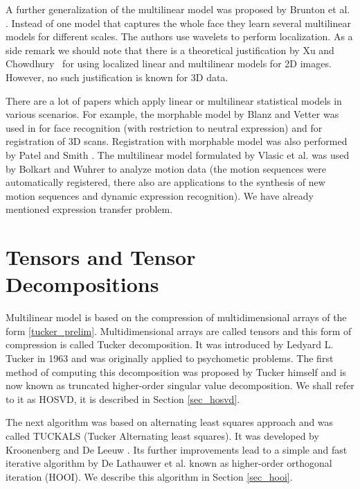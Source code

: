 A further generalization of the multilinear model was proposed by Brunton et al. \cite{brunton_mwave}.
Instead of one model that captures the whole face they learn several multilinear
models for different scales. The authors use wavelets to perform localization.
As a side remark we should note that there is a theoretical justification 
by Xu and Chowdhury~\cite{xu2008} for using localized linear and multilinear models for 2D images.
However, no such justification is known for 3D data.


There are a lot of papers which apply linear or multilinear statistical models 
in various scenarios. For example, the morphable model by Blanz and Vetter
was used in \cite{Blanz2007} for face recognition (with restriction to neutral expression) and for registration
of 3D scans. Registration with morphable model was also performed by Patel and Smith \cite{PatelSmith2009}.
The multilinear model formulated by Vlasic et al. \cite{vlasic} was used by Bolkart and Wuhrer \cite{BolkartWuhrer2014} to analyze motion data (the motion sequences were automatically registered, there also are applications
to the synthesis of new motion sequences and dynamic expression recognition).
We have already mentioned expression transfer problem. 

\section{Tensors and Tensor Decompositions}

Multilinear model is based on the compression of multidimensional arrays
of the form \eqref{tucker_prelim}. Multidimensional arrays
are called tensors and this form of compression is called Tucker decomposition. It was introduced by Ledyard L. Tucker  \cite{tucker_63} in 1963 and was originally applied to psychometic problems.
The first method of computing this decomposition was proposed by Tucker himself and
is now known as truncated higher-order singular value decomposition. We shall refer to it
as HOSVD, it is described in Section \ref{sec_hosvd}.


The next algorithm was based on alternating least squares
approach and was called TUCKALS (Tucker Alternating least squares). It was developed
by Kroonenberg and De Leeuw \cite{kroonenberg}. Its further improvements
lead to a simple and fast iterative algorithm by De Lathauwer et al. \cite{de2000best}
known as higher-order orthogonal iteration (HOOI). We describe this algorithm in Section \ref{sec_hooi}.


